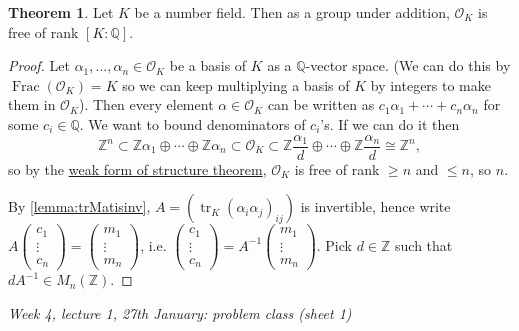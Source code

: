 \documentclass{article}
\newcommand{\Z}{\mathbb{Z}}
\newcommand{\Q}{\mathbb{Q}}
\newcommand{\tr}{\operatorname{tr}}
\newcommand{\Frac}{\operatorname{Frac}}
\newcommand{\ri}{\mathcal{O}}
\theoremstyle{definition}
\newtheorem{thm}[defn]{Theorem}
\begin{document}
\begin{thm}
\label{thm:ringofintisafreegrp}
Let $K$ be a number field. Then as a group under addition, $\ri_K$ is free of rank $[K:\Q]$.
\end{thm}
\begin{proof}
Let $\alpha_1,\ldots,\alpha_n\in\ri_K$ be a basis of $K$ as a $\Q$-vector space. (We can do this by $\Frac(\ri_K)=K$ so we can keep multiplying a basis of $K$ by integers to make them in $\ri_K$). Then every element $\alpha\in\ri_K$ can be written as $c_1\alpha_1+\cdots+c_n\alpha_n$ for some $c_i\in \Q$. We want to bound denominators of $c_i$'s. If we can do it then
\[
\Z^n\subset\Z\alpha_1\oplus\cdots\oplus\Z\alpha_n\subset\ri_K\subset \Z\frac{\alpha_1}{d}\oplus\cdots\oplus\Z\frac{\alpha_n}{d}\cong\Z^n,
\]
so by the \href{thm:structureweak}{weak form of structure theorem}, $\ri_K$ is free of rank $\geq n$ and $\leq n$, so $n$.

By \ref{lemma:trMatisinv}, $A=(\tr_K(\alpha_i\alpha_j)_{ij})$ is invertible, hence write $A\begin{pmatrix}
c_1\\ \vdots \\ c_n
\end{pmatrix}=\begin{pmatrix}
m_1 \\ \vdots \\ m_n
\end{pmatrix}$, i.e. $\begin{pmatrix}
c_1\\ \vdots \\ c_n
\end{pmatrix}=A^{-1}\begin{pmatrix}
m_1 \\ \vdots \\ m_n
\end{pmatrix}$. Pick $d\in\Z$ such that $dA^{-1}\in M_n(\Z)$.
\end{proof}

\begin{flushright}
\textit{Week 4, lecture 1, 27th January: problem class (sheet 1)}
\end{flushright}
\end{document}
